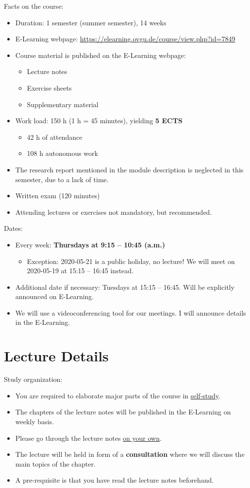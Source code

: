 Facts on the course:
\begin{itemize}
	\item Duration: 1 semester (summer semester), 14 weeks
	\item E-Learning webpage: \url{https://elearning.ovgu.de/course/view.php?id=7849}
	\item Course material is published on the E-Learning webpage:
	\begin{itemize}
		\item Lecture notes
		\item Exercise sheets
		\item Supplementary material
	\end{itemize}
	\item Work load: 150 h (1 h = 45 minutes), yielding \textbf{5 ECTS}
	\begin{itemize}
		\item 42 h of attendance
		\item 108 h autonomous work
	\end{itemize}
	\item The research report mentioned in the module description is neglected in this semester, due to a lack of time.
	\item Written exam (120 minutes)
	\item Attending lectures or exercises not mandatory, but recommended.
\end{itemize}

Dates:
\begin{itemize}
	\item Every week: \textbf{Thursdays at 9:15 -- 10:45 (a.m.)}
	\begin{itemize}
		\item Exception: 2020-05-21 is a public holiday, no lecture! We will meet on 2020-05-19 at 15:15 -- 16:45 instead.
	\end{itemize}
	\item Additional date if necessary: Tuesdays at 15:15 -- 16:45. Will be explicitly announced on E-Learning.
	\item We will use a videoconferencing tool for our meetings. I will announce details in the E-Learning.
\end{itemize}


\section{Lecture Details}

Study organization:
\begin{itemize}
	\item You are required to elaborate major parts of the course in \underline{self-study}.
	\item The chapters of the lecture notes will be published in the E-Learning on weekly basis.
	\item Please go through the lecture notes \underline{on your own}.
	\item The lecture will be held in form of a \textbf{consultation} where we will discuss the main topics of the chapter.
	\item A pre-requisite is that you have read the lecture notes beforehand.
\end{itemize}

